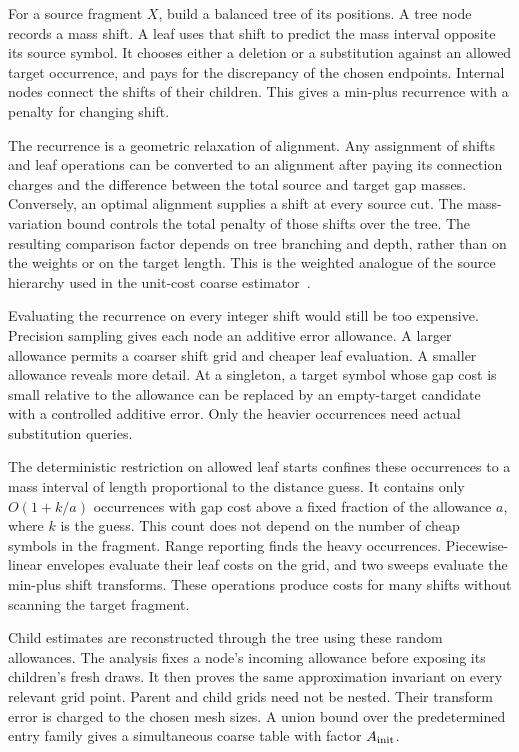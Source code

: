 \documentclass[11pt]{article}
\theoremstyle{definition}
\newcommand{\1}{\mathbf 1}
\begin{document}
For a source fragment $X$, build a balanced tree of its positions. A tree node records a mass shift.
A leaf uses that shift to predict the mass interval opposite its source
symbol. It chooses either a deletion or a substitution against an
allowed target occurrence, and pays for the discrepancy of the chosen
endpoints. Internal nodes connect the shifts of their children.
This gives a min-plus recurrence with a penalty for changing shift.

The recurrence is a geometric relaxation of alignment.
Any assignment of shifts and leaf operations can be converted to an
alignment after paying its connection charges and the difference
between the total source and target gap masses.
Conversely, an optimal alignment supplies a shift at every source cut.
The mass-variation bound controls the total penalty of those shifts
over the tree.
The resulting comparison factor depends on tree branching and depth,
rather than on the weights or on the target length.
This is the weighted analogue of the source hierarchy used in the
unit-cost coarse estimator~\cite{AKO10,openai}.

Evaluating the recurrence on every integer shift would still be too
expensive. Precision sampling gives each node an additive error
allowance. A larger allowance permits a coarser shift grid and cheaper
leaf evaluation. A smaller allowance reveals more detail.
At a singleton, a target symbol whose gap cost is small relative to
the allowance can be replaced by an empty-target candidate with a
controlled additive error. Only the heavier occurrences need actual
substitution queries.

The deterministic restriction on allowed leaf starts confines these
occurrences to a mass interval of length proportional to the distance
guess. It contains only $O(1+k/a)$ occurrences with gap cost above a fixed
fraction of the allowance $a$, where $k$ is the guess.
This count does not depend on the number of cheap symbols in the
fragment.
Range reporting finds the heavy occurrences.
Piecewise-linear envelopes evaluate their leaf costs on the grid,
and two sweeps evaluate the min-plus shift transforms.
These operations produce costs for many shifts without scanning the
target fragment.

Child estimates are reconstructed through the tree using these random
allowances.
The analysis fixes a node's incoming allowance before exposing its
children's fresh draws. It then proves the same approximation
invariant on every relevant grid point.
Parent and child grids need not be nested.
Their transform error is charged to the chosen mesh sizes.
A union bound over the predetermined entry family gives a simultaneous
coarse table with factor $A_{\rm init}$.
\end{document}
